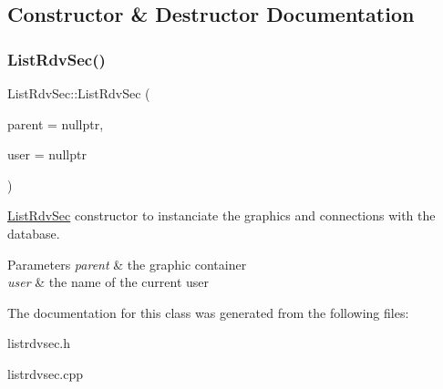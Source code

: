 \subsection{Constructor \& Destructor Documentation}
\mbox{\label{class_list_rdv_sec_a76dafffd7b1fd45d6e60389365960434}} 
\subsubsection{\texorpdfstring{ListRdvSec()}{ListRdvSec()}}
{\footnotesize\ttfamily List\+Rdv\+Sec\+::\+List\+Rdv\+Sec (\begin{DoxyParamCaption}\item[{Q\+Widget $\ast$}]{parent = {\ttfamily nullptr},  }\item[{Q\+String}]{user = {\ttfamily nullptr} }\end{DoxyParamCaption})\hspace{0.3cm}{\ttfamily [explicit]}}



\mbox{\hyperlink{class_list_rdv_sec}{List\+Rdv\+Sec}} constructor to instanciate the graphics and connections with the database. 


\begin{DoxyParams}{Parameters}
{\em parent} & the graphic container \\
\hline
{\em user} & the name of the current user \\
\hline
\end{DoxyParams}


The documentation for this class was generated from the following files\+:\begin{DoxyCompactItemize}
\item 
listrdvsec.\+h\item 
listrdvsec.\+cpp\end{DoxyCompactItemize}
